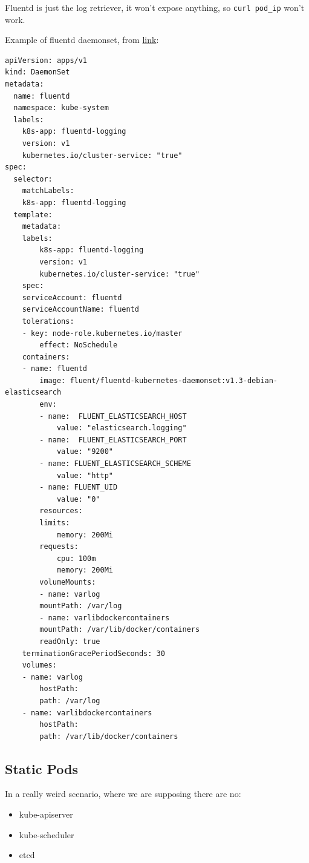 \documentclass{article}
\newenvironment{blocktemplateIII}[1]{%
    \tcolorbox[beamer,%
    noparskip,breakable,
    ,colframe=Red,%
    colbacklower=LimeGreen!75!LightGreen,%
    title=#1]}%
    {\endtcolorbox}
\newenvironment{codetemplate}[1][]{%
  \mybasecolorbox[#1]
  \itshape
}{%
  \endmybasecolorbox
}
\begin{document}
\begin{blocktemplateIII}{WARNING}
Fluentd is just the log retriever, it won't expose anything, so \verb|curl pod_ip| won't work.
\end{blocktemplateIII}

Example of fluentd daemonset, from \href{https://medium.com/@MetricFire/logging-for-kubernetes-fluentd-and-elasticsearch-9b95c7c64da}{link}:
\begin{codetemplate}{}
\begin{verbatim}
apiVersion: apps/v1
kind: DaemonSet
metadata:
  name: fluentd
  namespace: kube-system
  labels:
	k8s-app: fluentd-logging
	version: v1
	kubernetes.io/cluster-service: "true"
spec:
  selector:
	matchLabels:
  	k8s-app: fluentd-logging
  template:
	metadata:
  	labels:
    	k8s-app: fluentd-logging
    	version: v1
    	kubernetes.io/cluster-service: "true"
	spec:
  	serviceAccount: fluentd
  	serviceAccountName: fluentd
  	tolerations:
  	- key: node-role.kubernetes.io/master
    	effect: NoSchedule
  	containers:
  	- name: fluentd
    	image: fluent/fluentd-kubernetes-daemonset:v1.3-debian-elasticsearch
    	env:
      	- name:  FLUENT_ELASTICSEARCH_HOST
        	value: "elasticsearch.logging"
      	- name:  FLUENT_ELASTICSEARCH_PORT
        	value: "9200"
      	- name: FLUENT_ELASTICSEARCH_SCHEME
        	value: "http"
      	- name: FLUENT_UID
        	value: "0"
    	resources:
      	limits:
        	memory: 200Mi
      	requests:
        	cpu: 100m
        	memory: 200Mi
    	volumeMounts:
    	- name: varlog
      	mountPath: /var/log
    	- name: varlibdockercontainers
      	mountPath: /var/lib/docker/containers
      	readOnly: true
  	terminationGracePeriodSeconds: 30
  	volumes:
  	- name: varlog
    	hostPath:
      	path: /var/log
  	- name: varlibdockercontainers
    	hostPath:
      	path: /var/lib/docker/containers
\end{verbatim}
\end{codetemplate}

\subsection{Static Pods}
In a really weird scenario, where we are supposing there are no:
\begin{itemize}
    \item kube-apiserver
    \item kube-scheduler
    \item etcd
\end{itemize}
\end{document}
